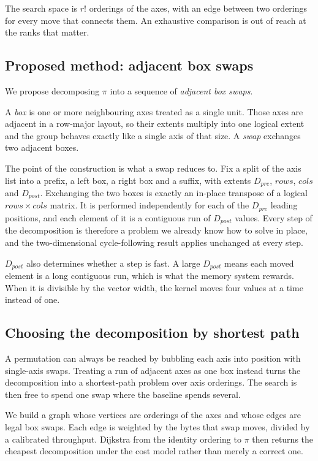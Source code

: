 The search space is $r!$ orderings of the axes, with an edge between two
orderings for every move that connects them. An exhaustive comparison is out
of reach at the ranks that matter.

\subsection{Proposed method: adjacent box swaps}
\label{sec:boxes}

We propose decomposing $\pi$ into a sequence of \emph{adjacent box swaps}.

A \emph{box} is one or more neighbouring axes treated as a single unit. Those
axes are adjacent in a row-major layout, so their extents multiply into one
logical extent and the group behaves exactly like a single axis of that size.
A \emph{swap} exchanges two adjacent boxes.

The point of the construction is what a swap reduces to. Fix a split of the
axis list into a prefix, a left box, a right box and a suffix, with extents
$D_{pre}$, $\mathit{rows}$, $\mathit{cols}$ and $D_{post}$. Exchanging the two
boxes is exactly an in-place transpose of a logical
$\mathit{rows} \times \mathit{cols}$ matrix. It is performed independently for
each of the $D_{pre}$ leading positions, and each element of it is a
contiguous run of $D_{post}$ values. Every step of the decomposition is
therefore a problem we already know how to solve in place, and the
two-dimensional cycle-following result applies unchanged at every step.

$D_{post}$ also determines whether a step is fast. A large $D_{post}$ means
each moved element is a long contiguous run, which is what the memory system
rewards. When it is divisible by the vector width, the kernel moves four
values at a time instead of one.

\subsection{Choosing the decomposition by shortest path}
\label{sec:planning}

A permutation can always be reached by bubbling each axis into position with
single-axis swaps. Treating a run of adjacent axes as one box instead turns
the decomposition into a shortest-path problem over axis orderings. The search
is then free to spend one swap where the baseline spends several.

We build a graph whose vertices are orderings of the axes and whose edges are
legal box swaps. Each edge is weighted by the bytes that swap moves, divided
by a calibrated throughput. Dijkstra from the identity ordering to $\pi$ then
returns the cheapest decomposition under the cost model rather than merely a
correct one.

